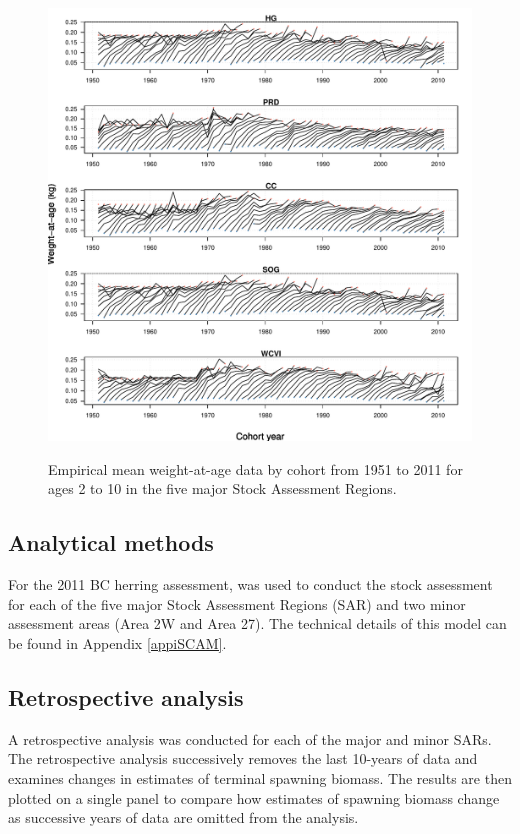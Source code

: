 \begin{figure}[!tbp]
	\centering
	\includegraphics[width=\textwidth]{../Figs/iscam_fig_MeanWt.pdf}\\
	\caption{Empirical mean weight-at-age data by cohort from 1951 to 2011 for ages 2 to 10 in the five major Stock Assessment Regions.}\label{FigMeanWt}
\end{figure}
	

	\subsection{Analytical methods}

	For the 2011 BC herring assessment, \iscam was used to conduct the stock assessment for each of the five major Stock Assessment Regions (SAR) and two minor assessment areas (Area 2W and Area 27).  The technical details of this model can be found in Appendix \ref{appiSCAM}.
		
	\subsection{Retrospective analysis}
	A retrospective analysis was conducted for each of the major and minor SARs.  The retrospective analysis successively removes the last 10-years of data and examines changes in estimates of terminal spawning biomass.  The results are then plotted on a single panel to compare how estimates of spawning biomass change as successive years of data are omitted from the analysis.
	
